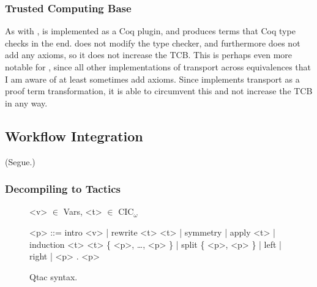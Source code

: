 \subsubsection{Trusted Computing Base}
\label{sec:pi-tcb}

As with \sysname, \toolnamec is implemented as a Coq plugin, and produces terms that Coq type checks in the end.
\toolnamec does not modify the type checker, and furthermore does not add any axioms, so it does not increase the TCB.
This is perhaps even more notable for \toolnamec, since all other implementations of transport across equivalences
that I am aware of at least sometimes add axioms.
Since \toolnamec implements transport as a proof term transformation, it is able to circumvent this and not increase the TCB in any way.

\subsection{Workflow Integration}
\label{sec:pi-workflow}

(Segue.)

\subsubsection{Decompiling to Tactics}

\begin{figure*}
\small
\begin{grammar}
<v> $\in$ Vars, <t> $\in$ CIC$_{\omega}$

<p> ::= intro <v> \hspace{0.05cm} | \hspace{0.05cm} rewrite <t> <t> \hspace{0.05cm} | \hspace{0.05cm} symmetry \hspace{0.05cm} | \hspace{0.05cm} apply <t> \hspace{0.05cm} | \hspace{0.05cm} induction <t> <t> \{ <p>, \ldots, <p> \} \hspace{0.05cm} | \hspace{0.05cm} split \{ <p>, <p> \} \hspace{0.05cm} | \hspace{0.05cm} left \hspace{0.05cm} | \hspace{0.05cm} right \hspace{0.05cm} | \hspace{0.05cm} <p> . <p>
\end{grammar}
\vspace{-0.4cm}
\caption{Qtac syntax.}
\vspace{-0.4cm}
\label{fig:ltacsyntax1}
\end{figure*}

